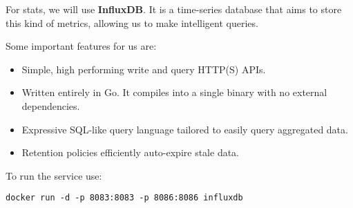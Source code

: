 For stats, we will use \textbf{InfluxDB}. It is a time-series database that aims to store this kind of metrics, allowing us to make intelligent queries.

Some important features for us are:

\begin{itemize}
    \item Simple, high performing write and query HTTP(S) APIs.
    \item Written entirely in Go. It compiles into a single binary with no external dependencies.
    \item Expressive SQL-like query language tailored to easily query aggregated data.
    \item Retention policies efficiently auto-expire stale data.
\end{itemize}

To run the service use:

\begin{lstlisting}
docker run -d -p 8083:8083 -p 8086:8086 influxdb
\end{lstlisting}
